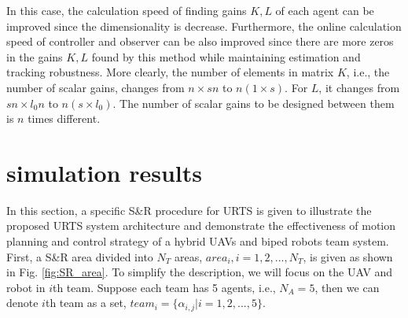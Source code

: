 \documentclass{ieeeaccess}
\newtheorem{remark}{Remark}
\begin{document}
In this case, the calculation speed of finding gains $K,L$ of each agent can be improved since the dimensionality is decrease. Furthermore, the online calculation speed of controller and observer can be also improved since there are more zeros in the gains $K,L$ found by this method while maintaining estimation and tracking robustness. More clearly, the number of elements in matrix $K$, i.e., the number of scalar gains, changes from $n\times sn$ to $n(1\times s)$. For $L$, it changes from $sn\times l_0n$ to $n(s\times l_0)$. The number of scalar gains to be designed between them is $n$ times different.

\section{simulation results}
In this section, a specific S\&R procedure for URTS is given to illustrate the proposed URTS system architecture and demonstrate the effectiveness of motion planning and control strategy of a hybrid UAVs and biped robots team system. First, a S\&R area divided into $N_T$ areas, $area_i,i=1,2,...,N_T$, is given as shown in Fig. \ref{fig:SR_area}. To simplify the description, we will focus on the UAV and robot in $i$th team. Suppose each team has 5 agents, i.e., $N_A=5$, then we can denote $i$th team as a set, $team_i=\{ \alpha_{i,j} | i=1,2,...,5 \}$.
\end{document}
